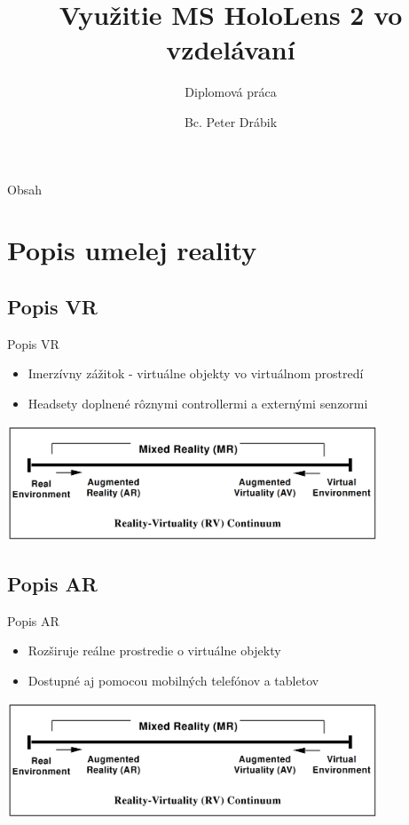 \documentclass[pdf,aspectratio=169]{beamer}
\title{Využitie MS HoloLens 2 vo vzdelávaní}
\subtitle{Diplomová práca}
\author{Bc. Peter Drábik}
\begin{document}
\date{}
\begin{frame}
    \titlepage 
\end{frame}

\begin{frame}{Obsah}
    \tableofcontents
\end{frame}


\section{Popis umelej reality}

\subsection{Popis VR}
\begin{frame}{Popis VR}
    \begin{itemize}
        \item Imerzívny zážitok - virtuálne objekty vo virtuálnom prostredí
        \item Headsety doplnené rôznymi controllermi a externými senzormi
    \end{itemize}
    \begin{center}
        \includegraphics[width=11cm]{../img/continuum.png}
    \end{center}
\end{frame}

\subsection{Popis AR}
\begin{frame}{Popis AR}
    \begin{itemize}
        \item Rozširuje reálne prostredie o virtuálne objekty
        \item Dostupné aj pomocou mobilných telefónov a tabletov
    \end{itemize}
    \begin{center}
        \includegraphics[width=11cm]{../img/continuum.png}
    \end{center} 
\end{frame}
\end{document}
